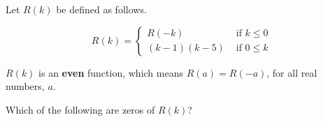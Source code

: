 \documentclass{ximera}
\author{Lee Wayand}
\begin{document}
\begin{exercise}




Let $R(k)$ be defined as follows.

\[
R(k) = 
\begin{cases}
  R(-k) & \text{ if }  k \le 0 \\
  (k-1)(k-5) & \text{ if } 0 \leq k 
\end{cases}
\]

$R(k)$ is an \textbf{even} function, which means $R(a) = R(-a)$, for all real numbers, $a$. \\


\begin{question}



Which of the following are zeros of $R(k)$?


\begin{selectAll}
\end{selectAll}

\end{question}


\end{exercise}
\end{document}
